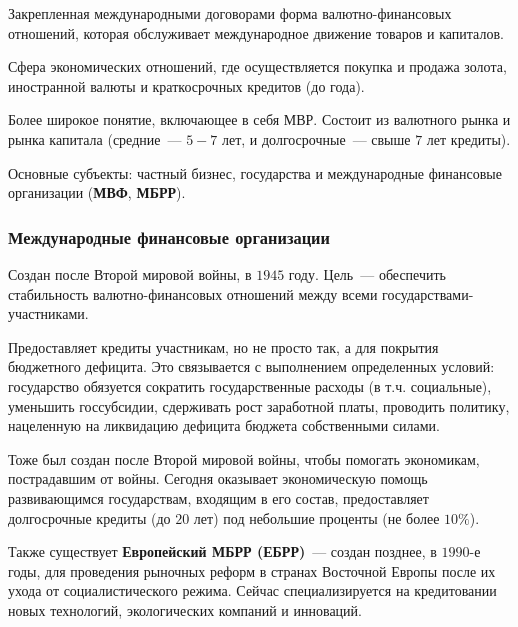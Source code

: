 \documentclass[12pt]{article}
\begin{document}
    \begin{definition}
    	Закрепленная международными договорами форма валютно-финансовых отношений, которая обслуживает международное движение товаров и капиталов.
    \end{definition}
    
    \begin{definition}
    	Сфера экономических отношений, где осуществляется покупка и продажа золота, иностранной валюты и краткосрочных кредитов (до года).
    \end{definition}
    
    \begin{definition}
    	Более широкое понятие, включающее в себя МВР. Состоит из валютного рынка и рынка капитала (средние~--- $5-7$ лет, и долгосрочные~--- свыше $7$ лет кредиты).
    	
    	Основные субъекты: частный бизнес, государства и международные финансовые организации (\textbf{МВФ}, \textbf{МБРР}).
    \end{definition}
    
    \subsubsection{Международные финансовые организации}
    
    \begin{note}
    	Создан после Второй мировой войны, в $1945$ году. Цель~--- обеспечить стабильность валютно-финансовых отношений между всеми государствами-участниками.
    	
    	Предоставляет кредиты участникам, но не просто так, а для покрытия бюджетного дефицита. Это связывается с выполнением определенных условий: государство обязуется сократить государственные расходы (в т.ч. социальные), уменьшить госсубсидии, сдерживать рост заработной платы, проводить политику, нацеленную на ликвидацию дефицита бюджета собственными силами.
    \end{note}
    
    \begin{note}
    	Тоже был создан после Второй мировой войны, чтобы помогать экономикам, пострадавшим от войны. Сегодня оказывает экономическую помощь развивающимся государствам, входящим в его состав, предоставляет долгосрочные кредиты (до $20$ лет) под небольшие проценты (не более $10\%$).
    	
    	Также существует \textbf{Европейский МБРР (ЕБРР)}~--- создан позднее, в $1990$-е годы, для проведения рыночных реформ в странах Восточной Европы после их ухода от социалистического режима. Сейчас специализируется на кредитовании новых технологий, экологических компаний и инноваций.
    \end{note}
    
\end{document}
